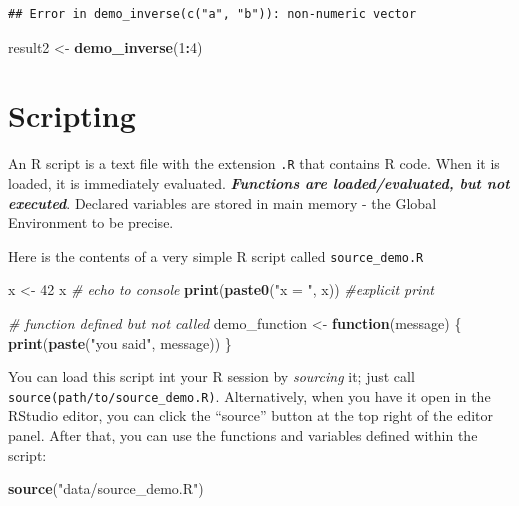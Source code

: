\documentclass[]{book}
\newenvironment{Shaded}{\begin{snugshade}}{\end{snugshade}}
\newcommand{\CommentTok}[1]{\textcolor[rgb]{0.56,0.35,0.01}{\textit{#1}}}
\newcommand{\ControlFlowTok}[1]{\textcolor[rgb]{0.13,0.29,0.53}{\textbf{#1}}}
\newcommand{\DecValTok}[1]{\textcolor[rgb]{0.00,0.00,0.81}{#1}}
\newcommand{\KeywordTok}[1]{\textcolor[rgb]{0.13,0.29,0.53}{\textbf{#1}}}
\newcommand{\NormalTok}[1]{#1}
\newcommand{\OperatorTok}[1]{\textcolor[rgb]{0.81,0.36,0.00}{\textbf{#1}}}
\newcommand{\StringTok}[1]{\textcolor[rgb]{0.31,0.60,0.02}{#1}}
\begin{document}
\begin{verbatim}
## Error in demo_inverse(c("a", "b")): non-numeric vector
\end{verbatim}

\begin{Shaded}
\begin{Highlighting}[]
\NormalTok{result2 <-}\StringTok{ }\KeywordTok{demo_inverse}\NormalTok{(}\DecValTok{1}\OperatorTok{:}\DecValTok{4}\NormalTok{)}
\end{Highlighting}
\end{Shaded}

\hypertarget{scripting-1}{%
\section{Scripting}\label{scripting-1}}

An R script is a text file with the extension \texttt{.R} that contains R code. When it is loaded, it is immediately evaluated. \textbf{\emph{Functions are loaded/evaluated, but not executed}}. Declared variables are stored in main memory - the Global Environment to be precise.

Here is the contents of a very simple R script called \texttt{source\_demo.R}

\begin{Shaded}
\begin{Highlighting}[]
\NormalTok{x <-}\StringTok{ }\DecValTok{42}
\NormalTok{x }\CommentTok{# echo to console}
\KeywordTok{print}\NormalTok{(}\KeywordTok{paste0}\NormalTok{(}\StringTok{"x = "}\NormalTok{, x)) }\CommentTok{#explicit print}

\CommentTok{# function defined but not called}
\NormalTok{demo_function <-}\StringTok{ }\ControlFlowTok{function}\NormalTok{(message) \{}
    \KeywordTok{print}\NormalTok{(}\KeywordTok{paste}\NormalTok{(}\StringTok{"you said"}\NormalTok{, message))}
\NormalTok{\}}
\end{Highlighting}
\end{Shaded}

You can load this script int your R session by \emph{sourcing} it; just call \texttt{source(path/to/source\_demo.R)}. Alternatively, when you have it open in the RStudio editor, you can click the ``source'' button at the top right of the editor panel. After that, you can use the functions and variables defined within the script:

\begin{Shaded}
\begin{Highlighting}[]
\KeywordTok{source}\NormalTok{(}\StringTok{"data/source_demo.R"}\NormalTok{)}
\end{Highlighting}
\end{Shaded}
\end{document}
